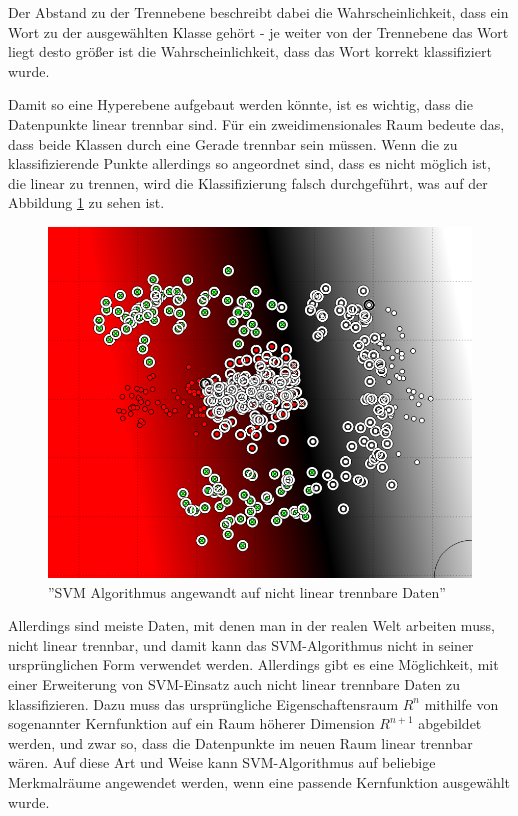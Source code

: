 Der Abstand zu der Trennebene beschreibt dabei die Wahrscheinlichkeit, dass ein Wort zu der ausgewählten Klasse gehört - je weiter von der Trennebene das Wort liegt desto größer ist die Wahrscheinlichkeit, dass das Wort korrekt klassifiziert wurde.

Damit so eine Hyperebene aufgebaut werden könnte, ist es wichtig, dass die Datenpunkte linear trennbar sind. Für ein zweidimensionales Raum bedeute das, dass beide Klassen durch eine Gerade trennbar sein müssen. Wenn die zu klassifizierende Punkte allerdings so angeordnet sind, dass es nicht möglich ist, die linear zu trennen, wird die Klassifizierung falsch durchgeführt, was auf der Abbildung \ref{fig:SVM-NONLINEAR-ISSUE} zu sehen ist.

\begin{figure}
\centering
\includegraphics[width=\textwidth,angle=90]{Bilder/svm-nonlinear-issue.png}
\caption{''SVM Algorithmus angewandt auf nicht linear trennbare Daten''}
\label{fig:SVM-NONLINEAR-ISSUE}
\end{figure}

Allerdings sind meiste Daten, mit denen man in der realen Welt arbeiten muss, nicht linear trennbar, und damit kann das SVM-Algorithmus nicht in seiner ursprünglichen Form verwendet werden. Allerdings gibt es eine Möglichkeit, mit einer Erweiterung von SVM-Einsatz auch nicht linear trennbare Daten zu klassifizieren. Dazu muss das ursprüngliche Eigenschaftensraum $R^n$ mithilfe von sogenannter Kernfunktion auf ein Raum höherer Dimension $R^{n+1}$ abgebildet werden, und zwar so, dass die Datenpunkte im neuen Raum linear trennbar wären\cite{Hearst:98}. Auf diese Art und Weise kann SVM-Algorithmus auf beliebige Merkmalräume angewendet werden, wenn eine passende Kernfunktion ausgewählt wurde\cite{hsu2003practical}.

